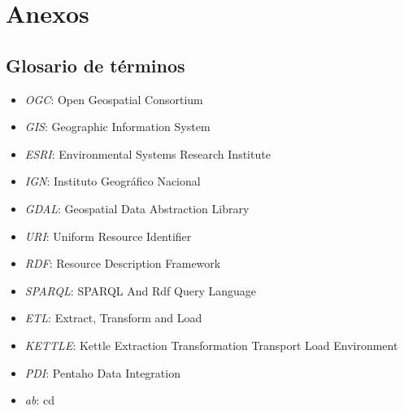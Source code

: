 \chapter{Anexos}
\section{Glosario de términos}
\begin{itemize}
    \item \textit{OGC}: Open Geospatial Consortium
    \item \textit{GIS}: Geographic Information System
    \item \textit{ESRI}: Environmental Systems Research Institute
    \item \textit{IGN}: Instituto Geográfico Nacional
    \item \textit{GDAL}: Geospatial Data Abstraction Library
    \item \textit{URI}: Uniform Resource Identifier
    \item \textit{RDF}: Resource Description Framework
    \item \textit{SPARQL}: SPARQL And Rdf Query Language
    \item \textit{ETL}: Extract, Transform and Load
    \item \textit{KETTLE}: Kettle Extraction Transformation Transport Load Environment
    \item \textit{PDI}: Pentaho Data Integration
    \item \textit{ab}: cd
\end{itemize}





 
